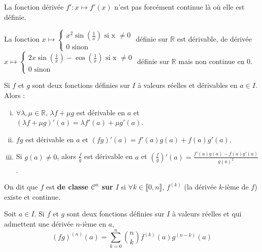 	
	\begin{remark}
		La fonction dérivée $f' : x \mapsto f'(x)$ n'est pas forcément continue là où elle est définie.
	\end{remark}
	
	\begin{example}
		La fonction $x \mapsto \begin{cases}
			x^2 \sin \left(\frac{1}{x}\right) \text{ si x } \neq 0 \\
			0 \text{ sinon}
		\end{cases}$ définie sur $\mathbb{R}$ est dérivable, de dérivée $x \mapsto \begin{cases}
		2x \sin \left(\frac{1}{x}\right) - \cos \left(\frac{1}{x}\right) \text{ si x } \neq 0 \\
		0 \text{ sinon}
		\end{cases}$ définie sur $\mathbb{R}$ mais non continue en $0$.
	\end{example}
	
	\begin{proposition}
		Si $f$ et $g$ sont deux fonctions définies sur $I$ à valeurs réelles et dérivables en $a \in I$. Alors :
		\begin{enumerate}[(i)]
			\item $\forall \lambda, \mu \in \mathbb{R}, \, \lambda f + \mu g$ est dérivable en $a$ et $(\lambda f + \mu g)'(a) = \lambda f'(a) + \mu g'(a)$.
			\item $fg$ est dérivable en $a$ et $(fg)'(a) = f'(a) g(a) + f(a) g'(a)$.
			\item Si $g(a) \neq 0$, alors $\frac{f}{g}$ est dérivable en $a$ et $\left(\frac{f}{g}\right)'(a) = \frac{f'(a) g(a) - f(a) g'(a)}{g(a)^2}$.
 		\end{enumerate}
	\end{proposition}
	
	\begin{definition}
		On dit que $f$ est \textbf{de classe $\mathcal{C}^n$ sur $I$} si $\forall k \in \llbracket 0, n \rrbracket$, $f^{(k)}$ (la dérivée $k$-ième de $f$) existe et continue.
	\end{definition}
	
	\begin{proposition}
		Soit $a \in I$. Si $f$ et $g$ sont deux fonctions définies sur $I$ à valeurs réelles et qui admettent une dérivée $n$-ième en $a$,
		\[ (fg)^{(n)}(a) = \sum_{k=0}^n \binom{n}{k} f^{(k)}(a) g^{(n-k)}(a) \]
	\end{proposition}
	
